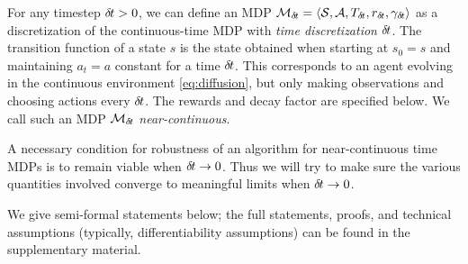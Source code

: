 For any timestep ${\delta\hspace{-.1em}t}>0$, we can define an MDP ${\cal
M}_{\delta\hspace{-.1em}t} = \langle {\cal S}, {\cal A}, T_{{\delta\hspace{-.1em}t}}, r_{\delta\hspace{-.1em}t},
      \gamma_{\delta\hspace{-.1em}t}\rangle$ as a discretization of the continuous-time MDP with
      \emph{time discretization} ${\delta\hspace{-.1em}t}$. The %
      transition function of a state $s$
      is %
      the
      state obtained
      when starting at $s_0 = s$ and maintaining $a_t=a$ constant for a time
      ${\delta\hspace{-.1em}t}$.
      This corresponds to an agent evolving in the continuous
      environment \eqref{eq:diffusion}, but 
      only making observations and choosing actions every ${\delta\hspace{-.1em}t}$. The
      rewards and decay factor are specified below. We
      call such an  MDP ${\cal M}_{\delta\hspace{-.1em}t}$
      \emph{near-continuous}.      %



A necessary condition for robustness of an algorithm for
near-continuous time MDPs is 
to remain viable when ${\delta\hspace{-.1em}t} \rightarrow 0$. Thus we will try to
make sure the various quantities involved converge to meaningful
limits when ${\delta\hspace{-.1em}t}\to 0$. 

We give semi-formal statements below; the full statements, proofs, and
technical assumptions (typically, differentiability assumptions)
can be found in the supplementary material.

% 
      


